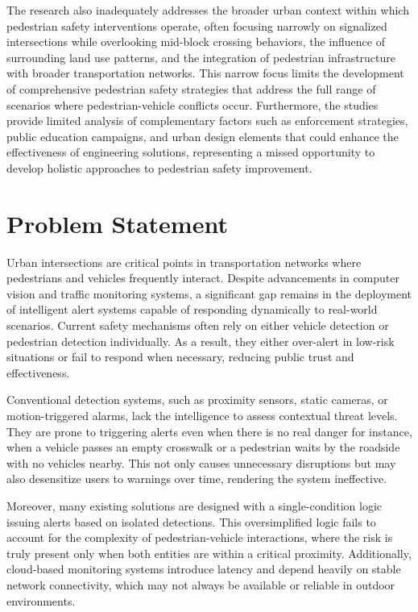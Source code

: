 \documentclass[a4paper, 12pt]{report}
\begin{document}
The research also inadequately addresses the broader urban context within which pedestrian safety interventions operate, often focusing narrowly on signalized intersections while overlooking mid-block crossing behaviors, the influence of surrounding land use patterns, and the integration of pedestrian infrastructure with broader transportation networks. This narrow focus limits the development of comprehensive pedestrian safety strategies that address the full range of scenarios where pedestrian-vehicle conflicts occur. Furthermore, the studies provide limited analysis of complementary factors such as enforcement strategies, public education campaigns, and urban design elements that could enhance the effectiveness of engineering solutions, representing a missed opportunity to develop holistic approaches to pedestrian safety improvement.


\section{Problem Statement}

Urban intersections are critical points in transportation networks where pedestrians and vehicles frequently interact. Despite advancements in computer vision and traffic monitoring systems, a significant gap remains in the deployment of intelligent alert systems capable of responding dynamically to real-world scenarios. Current safety mechanisms often rely on either vehicle detection or pedestrian detection individually. As a result, they either over-alert in low-risk situations or fail to respond when necessary, reducing public trust and effectiveness.

Conventional detection systems, such as proximity sensors, static cameras, or motion-triggered alarms, lack the intelligence to assess contextual threat levels. They are prone to triggering alerts even when there is no real danger for instance, when a vehicle passes an empty crosswalk or a pedestrian waits by the roadside with no vehicles nearby. This not only causes unnecessary disruptions but may also desensitize users to warnings over time, rendering the system ineffective.

Moreover, many existing solutions are designed with a single-condition logic issuing alerts based on isolated detections. This oversimplified logic fails to account for the complexity of pedestrian-vehicle interactions, where the risk is truly present only when both entities are within a critical proximity. Additionally, cloud-based monitoring systems introduce latency and depend heavily on stable network connectivity, which may not always be available or reliable in outdoor environments.
\end{document}
